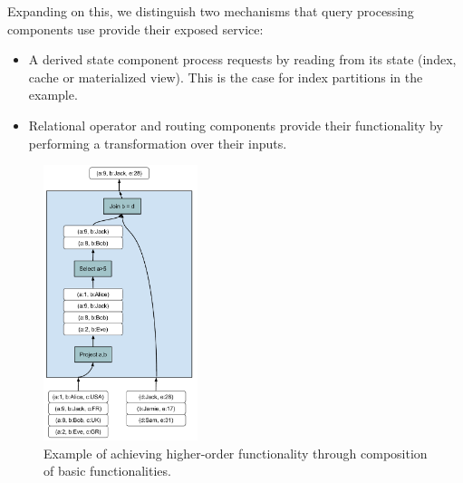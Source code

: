 Expanding on this, we distinguish two mechanisms that query processing components use provide their exposed service:
\begin{itemize}
  \item A derived state component process requests by reading from its state (index, cache or materialized view).
  This is the case for index partitions in the example.

  \item Relational operator and routing components provide their functionality by performing a transformation over their inputs.
\end{itemize}




\begin{figure}[t]
  \centering
    \includegraphics[width=0.4\textwidth]{./figures/design_pattern/observations_composition.pdf}
    \caption{Example of achieving higher-order functionality through composition of basic functionalities.}
    \label{fig:observations_composition}
\end{figure}

